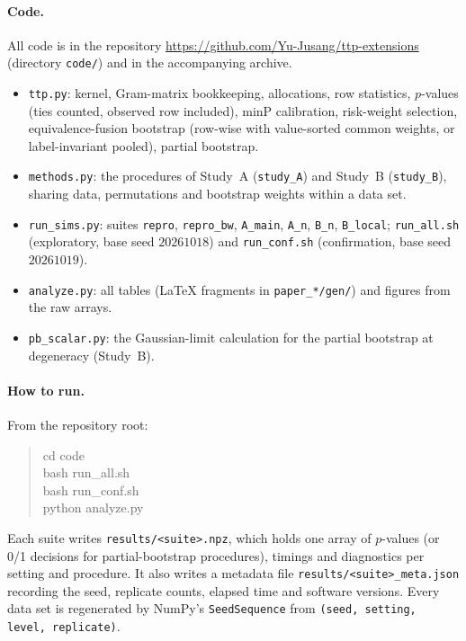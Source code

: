 \paragraph{Code.} All code is in the repository \url{https://github.com/Yu-Jusang/ttp-extensions} (directory \texttt{code/}) and in the accompanying archive.
\begin{itemize}[leftmargin=1.4em,itemsep=1pt]
\item \texttt{ttp.py}: kernel, Gram-matrix bookkeeping, allocations, row statistics, $p$-values (ties counted, observed row included), minP calibration, risk-weight selection, equivalence-fusion bootstrap (row-wise with value-sorted common weights, or label-invariant pooled), partial bootstrap.
\item \texttt{methods.py}: the procedures of Study~A (\texttt{study\_A}) and Study~B (\texttt{study\_B}), sharing data, permutations and bootstrap weights within a data set.
\item \texttt{run\_sims.py}: suites \texttt{repro}, \texttt{repro\_bw}, \texttt{A\_main}, \texttt{A\_n}, \texttt{B\_n}, \texttt{B\_local}; \texttt{run\_all.sh} (exploratory, base seed $20261018$) and \texttt{run\_conf.sh} (confirmation, base seed $20261019$).
\item \texttt{analyze.py}: all tables (\LaTeX{} fragments in \texttt{paper\_*/gen/}) and figures from the raw arrays.
\item \texttt{pb\_scalar.py}: the Gaussian-limit calculation for the partial bootstrap at degeneracy (Study~B).
\end{itemize}

\paragraph{How to run.} From the repository root:
\begin{quote}\ttfamily
cd code\\
bash run\_all.sh\\
bash run\_conf.sh\\
python analyze.py
\end{quote}
Each suite writes \texttt{results/<suite>.npz}, which holds one array of $p$-values (or 0/1 decisions for partial-bootstrap procedures), timings and diagnostics per setting and procedure. It also writes a metadata file \texttt{results/<suite>\_meta.json} recording the seed, replicate counts, elapsed time and software versions. Every data set is regenerated by NumPy's \texttt{SeedSequence} from \texttt{(seed, setting, level, replicate)}.

